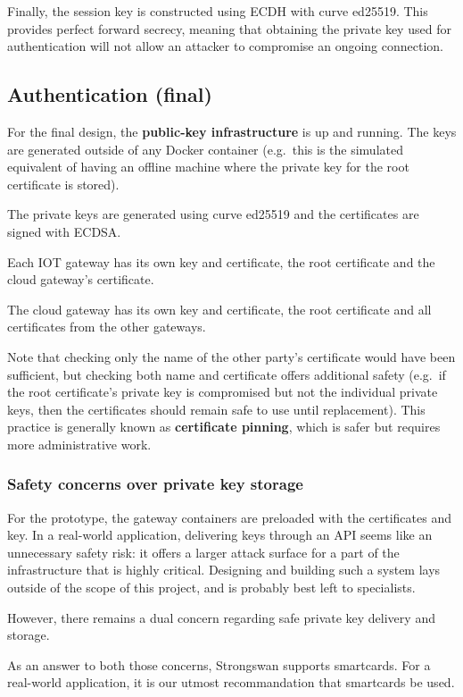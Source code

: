\documentclass[paper=a4, fontsize=11pt]{scrartcl}
\begin{document}
Finally, the session key is constructed using ECDH with curve ed25519.
This provides perfect forward secrecy, meaning that obtaining the private key
used for authentication will not allow an attacker to compromise an ongoing
connection.

\subsection{Authentication (final)}

For the final design, the \textbf{public-key infrastructure} is up and running.
The keys are generated outside of any Docker container (e.g.\ this is the
simulated equivalent of having an offline machine where the private key for the
root certificate is stored).

The private keys are generated using curve ed25519 and the certificates are
signed with ECDSA\@.

Each IOT gateway has its own key and certificate, the root certificate and the
cloud gateway's certificate.

The cloud gateway has its own key and certificate, the root certificate and all
certificates from the other gateways.

Note that checking only the name of the other party's certificate would have
been sufficient, but checking both name and certificate offers additional safety
(e.g.\ if the root certificate's private key is compromised but not the
individual private keys, then the certificates should remain safe to use until
replacement).
This practice is generally known as \textbf{certificate pinning}, which is safer
but requires more administrative work.

\subsubsection{Safety concerns over private key storage}

For the prototype, the gateway containers are preloaded with the certificates
and key.
In a real-world application, delivering keys through an API seems like an
unnecessary safety risk: it offers a larger attack surface for a part of the
infrastructure that is highly critical.
Designing and building such a system lays outside of the scope of this project,
and is probably best left to specialists.

However, there remains a dual concern regarding safe private key delivery and
storage.

As an answer to both those concerns, Strongswan supports smartcards.
For a real-world application, it is our utmost recommandation that
smartcards be used.
\end{document}
